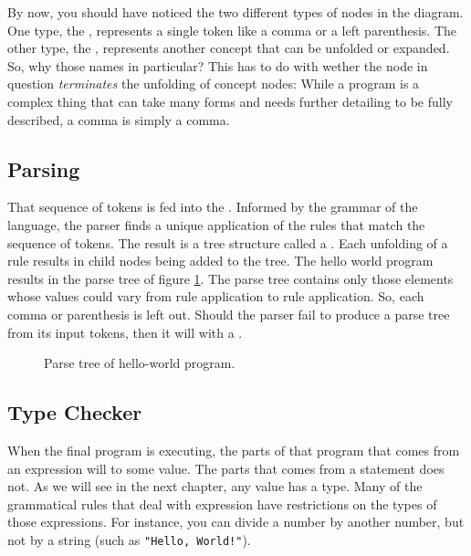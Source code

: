 By now, you should have noticed the two different types of nodes in the diagram. One type, the , represents a single token like a comma or a left parenthesis. The other type, the , represents another concept that can be unfolded or expanded. So, why those names in particular? This has to do with wether the node in question \textsl{terminates} the unfolding of concept nodes: While a program is a complex thing that can take many forms and needs further detailing to be fully described, a comma is simply a comma.

\subsection{Parsing}

That sequence of tokens is fed into the . Informed by the grammar of the language, the parser finds a unique application of the rules that match the sequence of tokens. The result is a tree structure called a . Each unfolding of a rule results in child nodes being added to the tree. The hello world program results in the parse tree of figure \ref{fig:first:hello:parsetree}. The parse tree contains only those elements whose values could vary from rule application to rule application. So, each comma or parenthesis is left out. Should the parser fail to produce a parse tree from its input tokens, then it will  with a .

\begin{figure}[tbp]
  
  \caption{Parse tree of hello-world program.}
  \label{fig:first:hello:parsetree}
\end{figure}

\subsection{Type Checker}

When the final program is executing, the parts of that program that comes from an expression will  to some value. The parts that comes from a statement does not. As we will see in the next chapter, any value has a type. Many of the grammatical rules that deal with expression have restrictions on the types of those expressions. For instance, you can divide a number by another number, but not by a string (such as \texttt{"Hello, World!"}).

